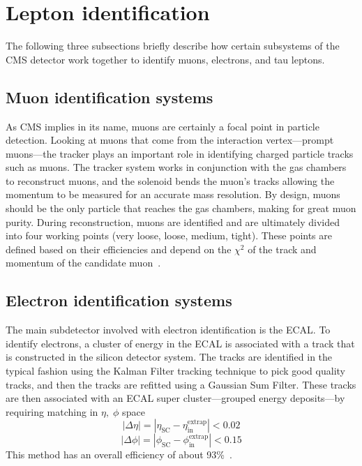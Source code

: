 
\section{Lepton identification}
The following three subsections briefly describe how certain subsystems of the CMS detector work together to identify muons, electrons, and tau leptons. 

\subsection{Muon identification systems}

As CMS implies in its name, muons are certainly a focal point in particle detection. 
Looking at muons that come from the interaction vertex---prompt muons---the tracker plays an important role in identifying charged particle tracks such as muons. 
The tracker system works in conjunction with the gas chambers to reconstruct muons, and the solenoid bends the muon's tracks allowing the momentum to be measured for an accurate mass resolution. By design, muons should be the only particle that reaches the gas chambers, making for great muon purity. 
During reconstruction, muons are identified and are ultimately divided into four working points (very loose, loose, medium, tight). These points are defined based on their efficiencies and depend on the $\chi^2$ of the track and momentum of the candidate muon~\cite{CMS-PAS-PFT-09-001,Kratschmer:1956760}.


\subsection{Electron identification systems}
The main subdetector involved with electron identification is the ECAL. To identify electrons, a cluster of energy in the ECAL is associated with a track that is constructed in the silicon detector system. 
The tracks are identified in the typical fashion using the Kalman Filter tracking technique to pick good quality tracks, and then the tracks are refitted using a Gaussian Sum Filter. 
These tracks are then associated with an ECAL super cluster---grouped energy deposits---by requiring matching in $\eta,\;\phi$ space
\begin{equation}|\Delta\eta| = |\eta_{\text{SC}} - \eta_{\text{in}}^{\text{extrap}}| < 0.02\end{equation}
\begin{equation}|\Delta\phi| = |\phi_{\text{SC}} - \phi_{\text{in}}^{\text{extrap}}| < 0.15\end{equation}
This method has an overall efficiency of about 93\%~\cite{Khachatryan:2015hwa}. 

